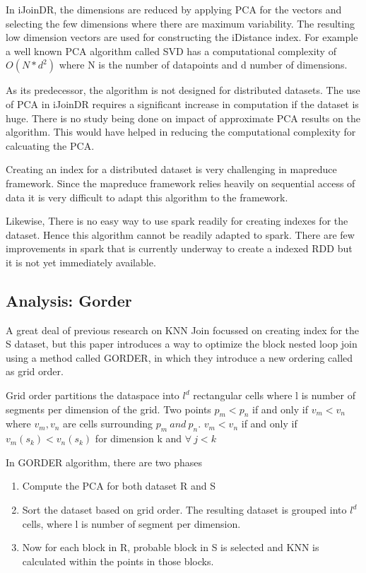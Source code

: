 \documentclass[conference]{IEEEtran}
\begin{document}
In iJoinDR, the dimensions are reduced by applying PCA for the
vectors and selecting the few dimensions where there are maximum
variability. The resulting low dimension vectors
are used for constructing the iDistance index. For example a well
known PCA algorithm called SVD has a computational complexity of
$O(N * d^2)$ where N is the number of datapoints and d number of
dimensions.

\bigskip

As its predecessor, the algorithm is not designed for distributed
datasets. The use of PCA in iJoinDR requires a significant increase in
computation if the dataset is huge. There is no study being done on
impact of approximate PCA results on the algorithm. This would have
helped in reducing the computational complexity for calcuating the
PCA.

\medskip

Creating an index for a distributed dataset is very challenging in
mapreduce framework. Since the mapreduce framework relies heavily on
sequential access of data it is very difficult to adapt this
algorithm to the framework.

\medskip

Likewise, There is no easy way to use spark readily for creating
indexes for the dataset. Hence this algorithm cannot be readily
adapted to spark. There are few improvements in spark that is
currently underway to create a indexed RDD but it is not yet
immediately available.

\bigskip

\subsection{Analysis: Gorder}
A great deal of previous research on KNN Join focussed on creating
index for the S dataset, but this paper \cite{xia_gorder:_2004} introduces a
way to optimize the block nested loop join using a method called
GORDER, in which they introduce a new ordering called as grid order.

\medskip

Grid order partitions the dataspace into $l^d$ rectangular cells where
l is number of segments per dimension of the grid. Two points $p_m <
p_n $ if and only if $v_m < v_n$ where $v_m, v_n$ are cells
surrounding $p_m\ and\ p_n$. $v_m < v_n$ if and only if $v_m(s_k) <
v_n(s_k)$ for dimension k and $\forall\ j < k$
\bigskip

In GORDER algorithm, there are two phases
\begin{enumerate}
\item Compute the PCA for both dataset R and S
\item Sort the dataset based on grid order. The resulting dataset is
  grouped into $l^d$ cells, where l is number of segment per
  dimension.
\item Now for each block in R, probable block in S is selected and KNN
  is calculated within the points in those blocks.
\end{enumerate}
\end{document}
